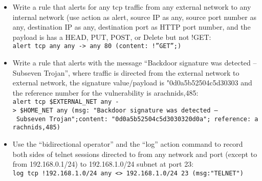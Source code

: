 \documentclass[]{report}
\providecommand{\tightlist}{%
  \setlength{\itemsep}{0pt}\setlength{\parskip}{0pt}}
\begin{document}
\begin{enumerate}
  \begin{itemize}
  \tightlist
  \item
    Write a rule that alerts for any tcp traffic from any external
    network to any internal network (use action as alert, source IP as
    any, source port number as any, destination IP as any, destination
    port as HTTP port number, and the payload is has a HEAD, PUT, POST,
    or Delete but not !GET:
    \texttt{alert\ tcp\ any\ any\ -\textgreater{}\ any\ 80\ (content:\ !”GET”;)}
  \item
    Write a rule that alerts with the message ``Backdoor signature was
    detected -- Subseven Trojan'', where traffic is directed from the
    external network to external network, the signature value/payload is
    "\textbar0d0a5b52504c5d30303 and the reference number for the
    vulnerability is arachnids,485:
    \texttt{alert\ tcp\ \$EXTERNAL\_NET\ any\ -\textgreater{}\ \$HOME\_NET\ any\ (msg:\ "Backdoor\ signature\ was\ detected\ –\ Subseven\ Trojan";content:\ "\textbar{}0d0a5b52504c5d3030320d0a\textbar{}";\ reference:\ arachnids,485)}
  \item
    Use the ``bidirectional operator'' and the ``log'' action command to
    record both sides of telnet sessions directed to from any network
    and port (except to from 192.168.0.1/24) to 192.168.1.0/24 subnet at
    port 23:
    \texttt{log\ tcp\ !192.168.1.0/24\ any\ \textless{}\textgreater{}\ 192.168.1.0/24\ 23\ (msg:"TELNET")}
  \end{itemize}
\end{enumerate}
\end{document}
